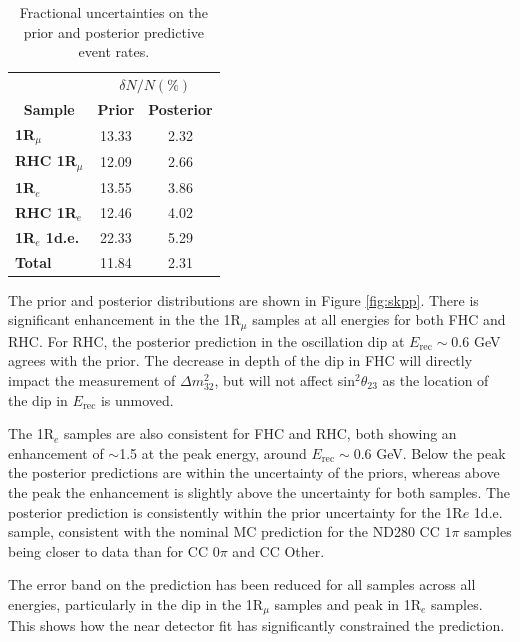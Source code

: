 \begin{center}
\begin{table}[!htbp]
\center
\begin{tabular}{l||c c}
\hline \hline
& \multicolumn{2}{c}{$\delta N/N (\%)$}\\
\multicolumn{1}{c||}{\textbf{Sample}} & \multicolumn{1}{c}{\textbf{Prior}} & \multicolumn{1}{c}{\textbf{Posterior}} \\
\hline\hline
\textbf{1R$_{\mu}$} & 13.33 & 2.32\\
\textbf{RHC 1R$_{\mu}$} & 12.09 & 2.66\\ 
\textbf{1R$_{e}$} & 13.55 & 3.86\\
\textbf{RHC 1R$_{e}$} & 12.46 & 4.02\\
\textbf{1R$_{e}$ 1d.e.} & 22.33 & 5.29\\ \hline
\textbf{Total} & 11.84 & 2.31\\ \hline\hline
\end{tabular}
\caption{Fractional uncertainties on the prior and posterior predictive \SK event rates.}
\label{tab:SKerr}
\end{table}
\end{center}

The prior and posterior distributions are shown in Figure \ref{fig:skpp}. There is significant enhancement in the the 1R$_{\mu}$ samples at all energies for both FHC and RHC. For RHC, the posterior prediction in the oscillation dip at $E_{\mathrm{rec}}\sim$0.6 GeV agrees with the prior. The decrease in depth of the dip in FHC will directly impact the measurement of $\Delta m_{32}^2$, but will not affect sin$^{2}\theta_{23}$ as the location of the dip in $E_{\mathrm{rec}}$ is unmoved. 

The 1R$_{e}$ samples are also consistent for FHC and RHC, both showing an enhancement of $\sim$1.5 at the peak energy, around $E_{\mathrm{rec}}\sim$0.6 GeV. Below the peak the posterior predictions are within the uncertainty of the priors, whereas above the peak the enhancement is slightly above the uncertainty for both samples. The posterior prediction is consistently within the prior uncertainty for the 1R$e$ 1d.e. sample, consistent with the nominal MC prediction for the ND280 CC $1\pi$ samples being closer to data than for CC $0\pi$ and CC Other.

The error band on the prediction has been reduced for all samples across all energies, particularly in the dip in the 1R$_{\mu}$ samples and peak in 1R$_{e}$ samples. This shows how the near detector fit has significantly constrained the \SK prediction.

